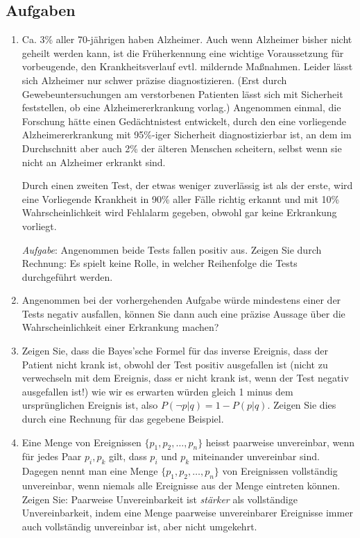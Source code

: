 \subsection{Aufgaben}
\begin{enumerate}
 
\item\label{beweis1} Ca. 3\% aller 70-jährigen haben Alzheimer. Auch
wenn Alzheimer bisher nicht geheilt werden kann, ist die
Früherkennung eine wichtige Voraussetzung für vorbeugende, den
Krankheitsverlauf evtl. mildernde Maßnahmen. Leider lässt sich
Alzheimer nur schwer präzise diagnostizieren. (Erst durch
Gewebeuntersuchungen am verstorbenen Patienten lässt sich mit
Sicherheit feststellen, ob eine Alzheimererkrankung vorlag.)
Angenommen einmal, die Forschung hätte einen Gedächtnistest
entwickelt, durch den eine vorliegende Alzheimererkrankung
mit 95\%-iger Sicherheit diagnostizierbar ist, an dem im
Durchschnitt aber auch 2\% der älteren Menschen scheitern, selbst wenn sie
nicht an Alzheimer erkrankt sind.

Durch einen zweiten Test, der etwas weniger zuverlässig ist als der erste, wird
eine Vorliegende Krankheit in 90\% aller Fälle richtig erkannt und mit 10\%
Wahrscheinlichkeit wird Fehlalarm gegeben, obwohl gar keine Erkrankung vorliegt.
 
{\em Aufgabe}: Angenommen beide Tests fallen positiv aus. Zeigen Sie durch
Rechnung: Es spielt keine Rolle, in welcher Reihenfolge die Tests durchgeführt werden.

\item Angenommen bei der vorhergehenden Aufgabe würde mindestens einer der
Tests negativ ausfallen, können Sie dann auch eine präzise Aussage über die
Wahrscheinlichkeit einer Erkrankung machen? 

\item\label{beweis2} Zeigen Sie, dass die Bayes'sche Formel für das inverse
Ereignis, dass der Patient nicht krank ist, obwohl der Test positiv ausgefallen ist (nicht zu
verwechseln mit dem Ereignis, dass er nicht krank ist, wenn der Test negativ
ausgefallen ist!) wie wir es erwarten würden gleich 1 minus dem ursprünglichen
Ereignis ist, also $P(\neg p|q) = 1 - P(p|q)$. Zeigen Sie dies durch
eine Rechnung für das gegebene Beispiel.

\item Eine Menge von Ereignissen $\{p_1, p_2, \ldots, p_n\}$ heisst paarweise
unvereinbar, wenn für jedes Paar $p_i,p_k$ gilt, dass $p_i$ und $p_k$
miteinander unvereinbar sind. Dagegen nennt man eine Menge $\{p_1, p_2, \ldots,
p_n\}$ von Ereignissen vollständig unvereinbar, wenn niemals alle Ereignisse aus
der Menge eintreten können. Zeigen Sie: Paarweise Unvereinbarkeit ist {\em stärker} als
vollständige Unvereinbarkeit, indem eine Menge paarweise unvereinbarer
Ereignisse immer auch vollständig unvereinbar ist, aber nicht umgekehrt.


\end{enumerate}
